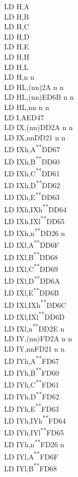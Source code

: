 \documentclass[twoside,openright,a4paper]{book}
\newcommand{\UNDOC}{\textnormal{\textsuperscript{**}}}
\begin{document}
\begin{multicols}{3}
{\begin{tabbing}
	LD H,A\\
	LD H,B\\
	LD H,C\\
	LD H,D\\
	LD H,E\\
	LD H,H\\
	LD H,L\\
	LD H,n n\\
	LD HL,(nn)\>2A n n\\
	LD HL,(nn)\>ED6B n n\\
	LD HL,nn n n\\
	LD I,A\>ED47\\
	LD IX,(nn)\>DD2A n n\\
	LD IX,nn\>DD21 n n\\
	LD IXh,A\UNDOC\>DD67\\
	LD IXh,B\UNDOC\>DD60\\
	LD IXh,C\UNDOC\>DD61\\
	LD IXh,D\UNDOC\>DD62\\
	LD IXh,E\UNDOC\>DD63\\
	LD IXh,IXh\UNDOC\>DD64\\
	LD IXh,IXl\UNDOC\>DD65\\
	LD IXh,n\UNDOC\>DD26 n \\
	LD IXl,A\UNDOC\>DD6F\\
	LD IXl,B\UNDOC\>DD68\\
	LD IXl,C\UNDOC\>DD69\\
	LD IXl,D\UNDOC\>DD6A\\
	LD IXl,E\UNDOC\>DD6B\\
	LD IXl,IXh\UNDOC\>DD6C\\
	LD IXl,IXl\UNDOC\>DD6D\\
	LD IXl,n\UNDOC\>DD2E n\\
	LD IY,(nn)\>FD2A n n\\
	LD IY,nn\>FD21 n n\\
	LD IYh,A\UNDOC\>FD67\\
	LD IYh,B\UNDOC\>FD60\\
	LD IYh,C\UNDOC\>FD61\\
	LD IYh,D\UNDOC\>FD62\\
	LD IYh,E\UNDOC\>FD63\\
	LD IYh,IYh\UNDOC\>FD64\\
	LD IYh,IYl\UNDOC\>FD65\\
	LD IYh,n\UNDOC\>FD26 n\\
	LD IYl,A\UNDOC\>FD6F\\
	LD IYl,B\UNDOC\>FD68\\

\end{tabbing}}
\end{multicols}
\end{document}
